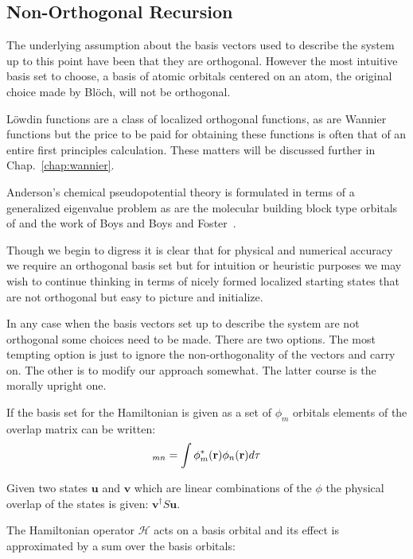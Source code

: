 \subsection{Non-Orthogonal Recursion}
\label{sec:tensornotation}
The underlying assumption about the basis vectors
used to describe the system up to this point have 
been that they are orthogonal. However the most intuitive basis set to 
choose, a basis of atomic orbitals centered on an atom, 
the original choice made by Bl\"och, will not be orthogonal. 

L\"owdin functions are a class of localized orthogonal functions,
as are Wannier functions but the price to be paid for
obtaining these functions is often that of an entire 
first principles calculation. These matters will 
be discussed further in Chap.~\ref{chap:wannier}.

Anderson's chemical pseudopotential theory is formulated 
in terms of a generalized eigenvalue problem \cite{anderson68,anderson69}
as are the molecular building block type orbitals of \cite{edmiston63} 
and the work of Boys and Boys and Foster~\cite{boys60a,boys60b}. 

Though we begin to digress it is clear that for physical 
and numerical accuracy we require an orthogonal basis 
set but for intuition or heuristic purposes we may wish to continue thinking
in terms of nicely formed localized starting states that 
are not orthogonal but easy to picture and initialize.

In any case when the basis vectors set up to describe the system
are not orthogonal some choices need to be made. There are two options.
The most tempting option is just to ignore the non-orthogonality of the
vectors and carry on. The other is to modify our approach somewhat. 
The latter course is the morally upright one. 

If the basis set for the Hamiltonian is given as a set of
${\phi_{m}}$ orbitals elements of the overlap matrix can 
be written:
%
\begin{equation}
[S]_{mn} = \int \phi^{*}_{m}(\r)\phi_{n}(\r)d\tau
\end{equation}
%

Given two states $\mathbf{u}$ and $\mathbf{v}$ which
are linear combinations of the $\phi$ the physical
overlap of the states is given: $\mathbf{v}^{\dagger}S\mathbf{u}$.

The Hamiltonian operator $\mathcal{H}$ acts on a basis orbital and
its effect is approximated by a sum over the basis orbitals:

